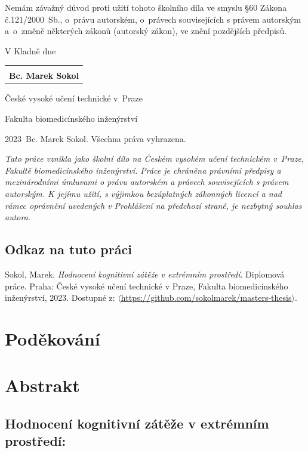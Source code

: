 \documentclass[a4paper,12pt,czech,oneside]{memoir}
\numberwithin{equation}{chapter}
\newcommand{\autor}{Bc. Marek Sokol}
\newcommand{\nazev}{Hodnocení kognitivní zátěže v extrémním prostředí}
\newcommand{\typ}{Diplomová práce}
\newcommand{\rok}{2023}
\begin{document}
\hspace{-0.75cm}Nemám závažný důvod proti užití tohoto školního díla ve smyslu
\S 60 Zákona č.121/2000~Sb., o~právu autorském, o~právech souvisejících s právem
autorským a~o~změně některých zákonů (autorský zákon), ve znění pozdějších
předpisů.
\vspace{1em}

\hspace{-0.75cm} V Kladně dne~
\hfill
\begin{tabular}[t]{@{}c@{}}
	\makebox[12em]{\dotfill} \\
	\textbf{\autor}
\end{tabular}
\clearpage


\null\vfill

\noindent České vysoké učení technické v~Praze

\noindent Fakulta biomedicínského inženýrství

\noindent \textcopyright{} \rok~\autor. Všechna práva vyhrazena.

\noindent \textit{Tato práce vznikla jako školní dílo na Českém vysokém učení
	technickém v~Praze, Fakultě biomedicínského inženýrství. Práce je chráněna
	právními předpisy a mezinárodními úmluvami o právu autorském a právech
	souvisejících s právem autorským. K jejímu užití, s výjimkou bezúplatných
	zákonných licencí a nad rámec oprávnění uvedených v Prohlášení na předchozí
	straně, je nezbytný souhlas autora.}

\subsection*{Odkaz na tuto práci} Sokol, Marek. \textit{\nazev}. \typ. Praha:
České vysoké učení technické v Praze, Fakulta biomedicínského inženýrství, 2023.
Dostupné z:
$\langle$\url{https://github.com/sokolmarek/masters-thesis}$\rangle$.
\clearpage

\null\vfill
\section*{Poděkování}

\clearpage

\null\vfill
\section*{Abstrakt}
\subsection*{\nazev:}

\end{document}
